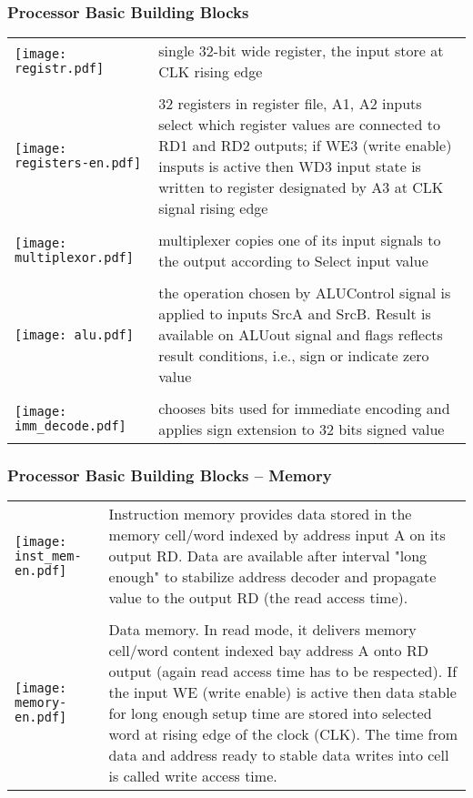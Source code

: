 \documentclass{beamer}
\begin{document}
\begin{frame}
\frametitle{Processor Basic Building Blocks}

\begin{table}
\footnotesize
\begin{tabular}{m{1.6cm} m{9.5cm}}
\hfill \texttt{[image: registr.pdf]} & single 32-bit wide register, the input store at CLK rising edge \\
\phantom{X} & \phantom{X} \\
\hfill \texttt{[image: registers-en.pdf]} & 32 registers in register file, A1, A2 inputs select which register values are connected to RD1 and RD2 outputs; if WE3 (write enable) insputs is active then WD3 input state is written to register designated by A3 at CLK signal rising edge \\
\phantom{X} & \phantom{X} \\
\hfill \texttt{[image: multiplexor.pdf]} & multiplexer copies one of its input signals to the output according to Select input value \\
\phantom{X} & \phantom{X} \\
\hfill \texttt{[image: alu.pdf]} & the operation chosen by ALUControl signal is applied to inputs SrcA and SrcB. Result is available on ALUout signal and flags reflects result conditions, i.e., sign or indicate zero value\\
\phantom{X} & \phantom{X} \\
\hfill \texttt{[image: imm\_decode.pdf]} & chooses bits used for immediate encoding and applies sign extension to 32 bits signed value \\
\end{tabular}
\end{table}

\end{frame}


\begin{frame}
\frametitle{Processor Basic Building Blocks -- Memory}

\begin{table}
\footnotesize
\begin{tabular}{m{2.2cm} m{9.0cm}}
\hfill \texttt{[image: inst\_mem-en.pdf]} & Instruction memory provides data stored in the memory cell/word indexed by address input A on its output RD. Data are available after interval "long enough" to stabilize address decoder and propagate value to the output RD (the read access time).\\
\phantom{X} & \phantom{X} \\
\hfill \texttt{[image: memory-en.pdf]} & Data memory. In read mode, it delivers memory cell/word content indexed bay address A onto RD output (again read access time has to be respected). If the input WE (write enable) is active then data stable for long enough setup time are stored into selected word at rising edge of the clock (CLK). The time from data and address ready to stable data writes into cell is called write access time.\\
\end{tabular}
\end{table}

\end{frame}
\end{document}

